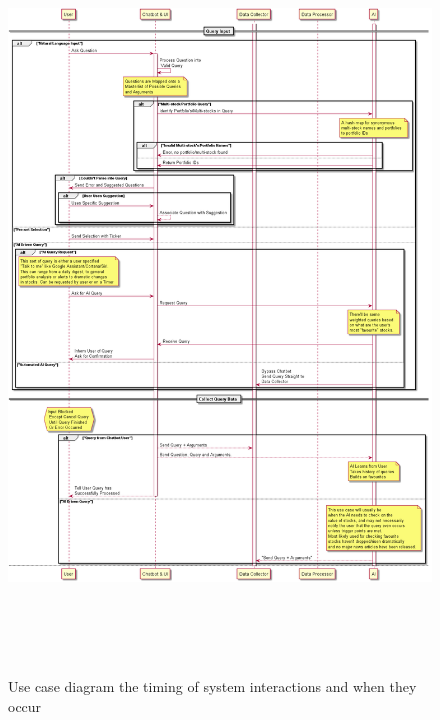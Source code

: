 \documentclass[]{IEEEtran}
\begin{document}
	\begin{figure}[h]
		\includegraphics[width=\textwidth, height = 20cm]{sequence}
		\caption{Use case diagram the timing of system interactions and when they occur}
	\end{figure}
	
\end{document}
